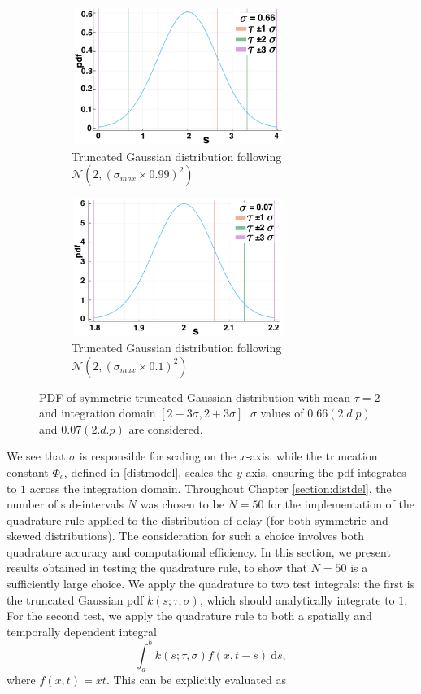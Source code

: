 \begin{figure}[H]
    \centering
    \begin{subfigure}[t]{0.45\textwidth}
        \centering
        \includegraphics[width=7cm,height=4.5cm]{t2sig1.png}
        \caption{Truncated Gaussian distribution following $\mathcal{N}(2,(\sigma_{max}\times0.99)^2)$}
        \label{}
    \end{subfigure}
    \hfill
    \begin{subfigure}[t]{0.45\textwidth}
        \centering
        \includegraphics[width=7cm,height=4.5cm]{t2sig2.png}
        \caption{Truncated Gaussian distribution following $\mathcal{N}(2,(\sigma_{max}\times0.1)^2)$}
        \label{}
    \end{subfigure}
    \caption{PDF of symmetric truncated Gaussian distribution with mean $\tau=2$ and integration domain $[2-3\sigma,2+3\sigma]$. $\sigma$ values of $0.66(2.d.p)$ and $0.07(2.d.p)$ are considered.}
    \label{fig:pdf2}
\end{figure}
We see that $\sigma$ is responsible for scaling on the $x$-axis, while the truncation constant $\Phi_c$, defined in \eqref{distmodel}, scales the $y$-axis, ensuring the pdf integrates to $1$ across the integration domain. Throughout Chapter \ref{section:distdel}, the number of sub-intervals $N$ was chosen to be $N=50$ for the implementation of the quadrature rule applied to the distribution of delay (for both symmetric and skewed distributions). The consideration for such a choice involves both quadrature accuracy and computational efficiency. In this section, we present results obtained in testing the quadrature rule, to show that $N=50$ is a sufficiently large choice. We apply the quadrature to two test integrals: the first is the truncated Gaussian pdf $k(s;\tau,\sigma)$, which should analytically integrate to $1$. For the second test, we apply the quadrature rule to both a spatially and temporally dependent integral
\begin{equation}\label{testint}
\int_a^bk(s;\tau,\sigma)f(x,t-s)\ \text{d}s,
\end{equation}
where $f(x,t)=xt$. This can be explicitly evaluated as


